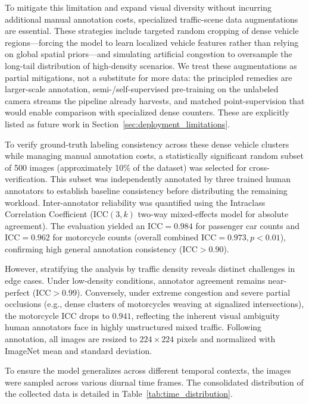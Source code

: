 \documentclass[a4paper,fleqn]{cas-sc}
\begin{document}
To mitigate this limitation and expand visual diversity without incurring additional manual annotation costs, specialized traffic-scene data augmentations are essential. These strategies include targeted random cropping of dense vehicle regions—forcing the model to learn localized vehicle features rather than relying on global spatial priors—and simulating artificial congestion to oversample the long-tail distribution of high-density scenarios. We treat these augmentations as partial mitigations, not a substitute for more data: the principled remedies are larger-scale annotation, semi-/self-supervised pre-training on the unlabeled camera streams the pipeline already harvests, and matched point-supervision that would enable comparison with specialized dense counters. These are explicitly listed as future work in Section~\ref{sec:deployment_limitations}.

To verify ground-truth labeling consistency across these dense vehicle clusters while managing manual annotation costs, a statistically significant random subset of 500 images (approximately 10\% of the dataset) was selected for cross-verification. This subset was independently annotated by three trained human annotators to establish baseline consistency before distributing the remaining workload. Inter-annotator reliability was quantified using the Intraclass Correlation Coefficient ($\text{ICC}(3,k)$ two-way mixed-effects model for absolute agreement). The evaluation yielded an $\text{ICC} = 0.984$ for passenger car counts and $\text{ICC} = 0.962$ for motorcycle counts (overall combined $\text{ICC} = 0.973, p < 0.01$), confirming high general annotation consistency ($\text{ICC} > 0.90$). 

However, stratifying the analysis by traffic density reveals distinct challenges in edge cases. Under low-density conditions, annotator agreement remains near-perfect ($\text{ICC} > 0.99$). Conversely, under extreme congestion and severe partial occlusions (e.g., dense clusters of motorcycles weaving at signalized intersections), the motorcycle ICC drops to $0.941$, reflecting the inherent visual ambiguity human annotators face in highly unstructured mixed traffic. Following annotation, all images are resized to $224 \times 224$ pixels and normalized with ImageNet mean and standard deviation.

To ensure the model generalizes across different temporal contexts, the images were sampled across various diurnal time frames. The consolidated distribution of the collected data is detailed in Table~\ref{tab:time_distribution}.
\end{document}
